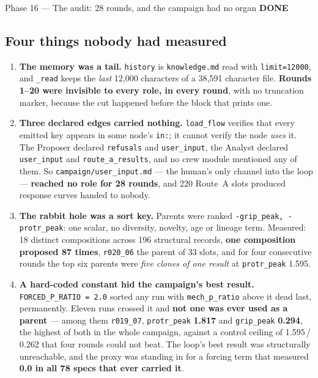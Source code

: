 \documentclass[11pt,a4paper]{article}
\newcommand{\code}[1]{\texttt{#1}}
\newcommand{\done}{\textcolor{good}{\textbf{DONE}}}
\begin{document}
\begin{phasebox}{Phase 16 --- The audit: 28 rounds, and the campaign had no organ \hfill \done}
\subsection*{Four things nobody had measured}
\begin{enumerate}[leftmargin=1.4em]
\item \textbf{The memory was a tail.} \code{history} is \code{knowledge.md} read with
\code{limit=12000}, and \code{\_read} keeps the \emph{last} 12{,}000 characters of a 38{,}591
character file. \textbf{Rounds 1--20 were invisible to every role, in every round}, with no
truncation marker, because the cut happened before the block that prints one.
\item \textbf{Three declared edges carried nothing.} \code{load\_flow} verifies that every emitted
key appears in some node's \code{in:}; it cannot verify the node \emph{uses} it. The Proposer
declared \code{refusals} and \code{user\_input}, the Analyst declared \code{user\_input} and
\code{route\_a\_results}, and no crew module mentioned any of them. So
\code{campaign/user\_input.md} --- the human's only channel into the loop --- \textbf{reached no
role for 28 rounds}, and 220 Route~A slots produced response curves handed to nobody.
\item \textbf{The rabbit hole was a sort key.} Parents were ranked \code{-grip\_peak,
-protr\_peak}: one scalar, no diversity, novelty, age or lineage term. Measured: 18 distinct
compositions across 196 structural records, \textbf{one composition proposed 87 times},
\code{r020\_06} the parent of 33 slots, and for four consecutive rounds the top six parents were
\emph{five clones of one result} at \code{protr\_peak} 1.595.
\item \textbf{A hard-coded constant hid the campaign's best result.} \code{FORCED\_P\_RATIO = 2.0}
sorted any run with \code{mech\_p\_ratio} above it dead last, permanently. Eleven runs crossed it
and \textbf{not one was ever used as a parent} --- among them \code{r019\_07}, \code{protr\_peak}
\textbf{1.817} and \code{grip\_peak} \textbf{0.294}, the highest of both in the whole campaign,
against a control ceiling of 1.595\,/\,0.262 that four rounds could not beat. The loop's best
result was structurally unreachable, and the proxy was standing in for a forcing term that measured
\textbf{0.0 in all 78 specs that ever carried it}.
\end{enumerate}


\end{phasebox}
\end{document}
